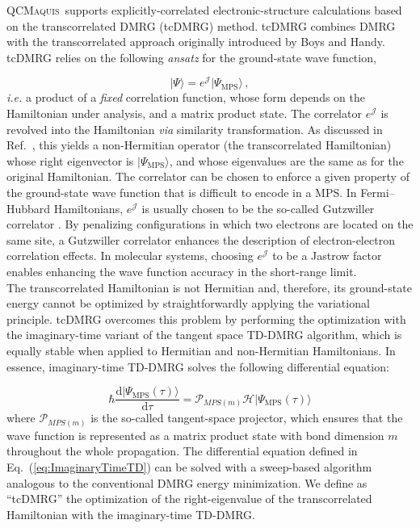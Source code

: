 \documentclass[bibliography=totoc,12pt,a4paper]{scrartcl}
\newcommand{\qcm}{\textsc{QCMaquis}}
\begin{document}
\qcm\ supports explicitly-correlated electronic-structure calculations based on the transcorrelated DMRG (tcDMRG) method.\cite{Baiardi2020_tcDMRG,Baiardi2022_tcDMRG-Molecules}
tcDMRG combines DMRG with the transcorrelated approach originally introduced by Boys and Handy.\cite{Boys1969_Transcorrelated}
tcDMRG relies on the following \textit{ansatz} for the ground-state wave function,

\begin{equation}
  \vert \Psi \rangle = e^{\mathcal{J}} \vert \Psi_\text{MPS} \rangle \, ,
  \label{eq:TranscorrelatedAnsatz}
\end{equation}
%
\textit{i.e.} a product of a \emph{fixed} correlation function, whose form depends on the Hamiltonian under analysis, and a matrix product state.
The correlator $e^{\mathcal{J}}$ is revolved into the Hamiltonian \textit{via} similarity transformation.
As discussed in Ref.~, this yields a non-Hermitian operator (the transcorrelated Hamiltonian) whose right eigenvector is $\vert \Psi_\text{MPS} \rangle$, and whose eigenvalues are the same as for the original Hamiltonian.
The correlator can be chosen to enforce a given property of the ground-state wave function that is difficult to encode in a MPS.
In Fermi--Hubbard Hamiltonians, $e^{\mathcal{J}}$ is usually chosen to be the so-called Gutzwiller correlator \cite{Dobrautz2019_tcFCIQMC-FermiHubbard,Baiardi2020_tcDMRG}.
By penalizing configurations in which two electrons are located on the same site, a Gutzwiller correlator enhances the description of electron-electron correlation effects.
In molecular systems, choosing $e^{\mathcal{J}}$ to be a Jastrow factor \cite{Guther2021_Transcorrelated-Molecules,Baiardi2022_tcDMRG-Molecules} enables enhancing the wave function accuracy in the short-range limit. \\

The transcorrelated Hamiltonian is not Hermitian and, therefore, its ground-state energy cannot be optimized by straightforwardly applying the variational principle.
tcDMRG overcomes this problem by performing the optimization with the imaginary-time variant of the tangent space TD-DMRG algorithm,\cite{Haegeman2016_TangentSpace} which is equally stable when applied to Hermitian and non-Hermitian Hamiltonians. 
In essence, imaginary-time TD-DMRG solves the following differential equation:

\begin{equation}
  \hbar \frac{\text{d} \vert \Psi_\text{MPS}(\tau) \rangle}{\text{d} \tau}
	= \mathcal{P}_{MPS(m)} \mathcal{H} \vert \Psi_\text{MPS}(\tau) \rangle
  \label{eq:ImaginaryTimeTD}
\end{equation}
%
where $\mathcal{P}_{MPS(m)}$ is the so-called tangent-space projector, which ensures that the wave function is represented as a matrix product state with bond dimension $m$ throughout the whole propagation.
The differential equation defined in Eq.~(\ref{eq:ImaginaryTimeTD}) can be solved with a sweep-based algorithm analogous to the conventional DMRG energy minimization.
We define as ``tcDMRG'' the optimization of the right-eigenvalue of the transcorrelated Hamiltonian with the imaginary-time TD-DMRG.
\end{document}
